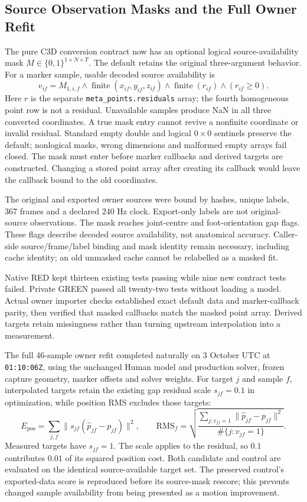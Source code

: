 \documentclass[11pt,a4paper]{article}
\begin{document}
\subsection{Source Observation Masks and the Full Owner Refit}
The pure C3D conversion contract now has an optional
logical source-availability mask $M\in\{0,1\}^{1\times N\times T}$.
The default retains the original three-argument behavior. For a marker
sample, usable decoded source availability is
\[
 v_{if}=M_{1,i,f}\land\operatorname{finite}(x_{if},y_{if},z_{if})
       \land\operatorname{finite}(r_{if})\land(r_{if}\geq0).
\]
Here $r$ is the separate \texttt{meta\_points.residuals} array;
the fourth homogeneous point row is not a residual. Unavailable samples
produce NaN in all three converted coordinates. A true mask entry cannot
revive a nonfinite coordinate or invalid residual. Standard empty double
and logical $0\times0$ sentinels preserve the default; nonlogical masks,
wrong dimensions and malformed empty arrays fail closed. The mask must
enter before marker callbacks and derived targets are constructed.
Changing a stored point array after creating its callback would leave
the callback bound to the old coordinates.

The original and exported owner sources were bound by hashes, unique
labels, 367 frames and a declared 240 Hz clock. Export-only labels are
not original-source observations. The mask reaches joint-centre and
foot-orientation gap flags. These flags describe decoded source
availability, not anatomical accuracy. Caller-side source/frame/label
binding and mask identity remain necessary, including cache identity;
an old unmasked cache cannot be relabelled as a masked fit.

Native RED kept thirteen existing tests passing while nine new contract
tests failed. Private GREEN passed all twenty-two tests without loading
a model. Actual owner importer checks established exact default data and
marker-callback parity, then verified that masked callbacks match the
masked point array. Derived targets retain missingness rather than
turning upstream interpolation into a measurement.

The full 46-sample owner refit completed naturally on 3 October UTC at
\texttt{01:10:06Z}, using the unchanged Human model and production solver,
frozen capture geometry, marker offsets and solver weights. For target
$j$ and sample $f$, interpolated targets retain the existing gap residual
scale $s_{jf}=0.1$ in optimization, while position RMS excludes those
targets:
\[
 E_{\mathrm{pos}}=\sum_{j,f}\|s_{jf}(\widehat p_{jf}-p_{jf})\|^2,
 \qquad
 \mathrm{RMS}_f=\sqrt{\frac{\sum_{j:v_{jf}=1}
       \|\widehat p_{jf}-p_{jf}\|^2}{\#\{j:v_{jf}=1\}}}.
\]
Measured targets have $s_{jf}=1$. The scale applies to the residual,
so $0.1$ contributes $0.01$ of its squared position cost. Both candidate
and control are evaluated on the identical source-available target set.
The preserved control's exported-data score is reproduced before its
source-mask rescore; this prevents changed sample availability from
being presented as a motion improvement.
\end{document}
